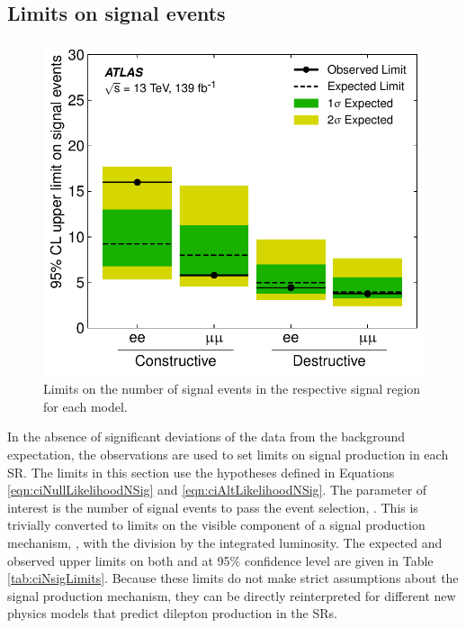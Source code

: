 \subsection{Limits on signal events}\label{sec:limNSig}

\begin{figure}[h!]
\begin{center}
\includegraphics[width=0.5\linewidth]{figures/ci/results/fig_03a.pdf}
\end{center}
\vspace{-.4cm}
\caption{Limits on the number of signal events in the respective signal region for each model. }
\label{fig:ciCiLimNSig}
\end{figure}

In the absence of significant deviations of the data from the background expectation, the observations are used to set limits on signal production in each SR.
The limits in this section use the hypotheses defined in Equations \ref{eqn:ciNullLikelihoodNSig} and \ref{eqn:ciAltLikelihoodNSig}.
The parameter of interest is the number of signal events to pass the event selection, \nsig.
This is trivially converted to limits on the visible component of a signal production mechanism, \xsbr, with the division by the integrated luminosity.
The expected and observed upper limits on both \nsig and \xsbr at 95\% confidence level are given in Table \ref{tab:ciNsigLimits}.
Because these limits do not make strict assumptions about the signal production mechanism, they can be directly reinterpreted for different new physics models that predict dilepton production in the SRs.

